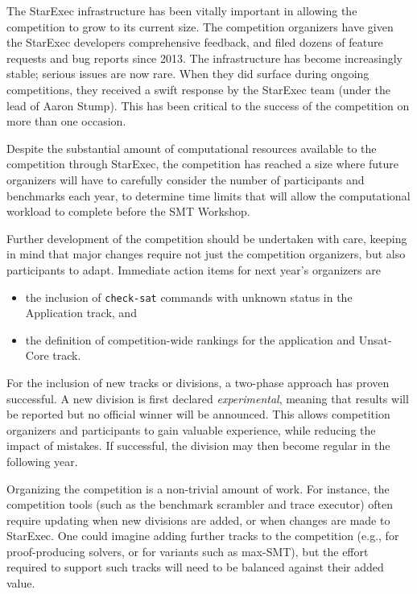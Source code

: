 \documentclass[dvipsnames,table,twoside,11pt]{article}
\begin{document}
The StarExec infrastructure has been vitally important in allowing the
competition to grow to its current size.  The competition organizers
have given the StarExec developers comprehensive feedback, and filed
dozens of feature requests and bug reports since 2013.  The
infrastructure has become increasingly stable; serious issues are now
rare.  When they did surface during ongoing competitions, they
received a swift response by the StarExec team (under the lead of
Aaron Stump).  This has been critical to the success of the
competition on more than one occasion.

Despite the substantial amount of computational resources available to
the competition through StarExec, the competition has reached a size
where future organizers will have to carefully consider the number of
participants and benchmarks each year, to determine time limits that
will allow the computational workload to complete before the SMT
Workshop.

Further development of the competition should be undertaken with care,
keeping in mind that major changes require not just the competition
organizers, but also participants to adapt.  Immediate action items
for next year's organizers are
\begin{itemize}
\item the inclusion of {\tt check-sat} commands with unknown status in
  the Application track, and
\item the definition of competition-wide rankings for the application
  and Unsat-Core track.
\end{itemize}

For the inclusion of new tracks or divisions, a two-phase approach has
proven successful.  A new division is first declared
\emph{experimental}, meaning that results will be reported but no
official winner will be announced.  This allows competition organizers
and participants to gain valuable experience, while reducing the
impact of mistakes.  If successful, the division may then become
regular in the following year.

Organizing the competition is a non-trivial amount of work.  For
instance, the competition tools (such as the benchmark scrambler and
trace executor) often require updating when new divisions are added,
or when changes are made to StarExec.  One could imagine adding
further tracks to the competition (e.g., for proof-producing solvers,
or for variants such as max-SMT), but the effort required to support
such tracks will need to be balanced against their added value.
\end{document}
